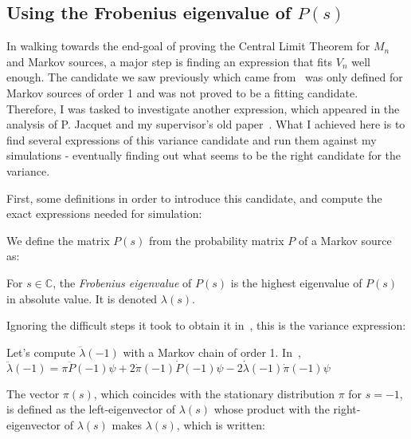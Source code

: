 
\subsection{Using the Frobenius eigenvalue of $P(s)$}


In walking towards the end-goal of proving the Central Limit
Theorem for $M_n$ and Markov sources, a major step is finding
an expression that fits $V_n$ well enough. The candidate we
saw previously which came from~\cite{leckey_limit_2015} was 
only defined for Markov sources of order 1 and was not proved
to be a fitting candidate. Therefore, I was tasked to investigate
another expression, which appeared in the analysis of 
P. Jacquet and my supervisor's old paper~\cite{jacquet_average_2001}.
What I achieved here is to find several expressions of 
this variance candidate and run them against my simulations - eventually
finding out what seems to be the right candidate for the variance.

First, some definitions in order to introduce this candidate, and 
compute the exact expressions needed for simulation:

\begin{df}
    We define the matrix $P(s)$ from the probability matrix $P$ of a 
    Markov source as:
    \label{def:ps}
\end{df}

\begin{df}
    For $s\in\mathbb{C}$, the \emph{Frobenius eigenvalue} of $P(s)$ is the highest 
    eigenvalue of $P(s)$ in absolute value. It is denoted $\lambda(s)$.
    \label{def:frob}
\end{df}

\noindent
Ignoring the difficult steps it took to obtain it in~\cite{jacquet_average_2001},
this is the variance expression:


\noindent Let's compute $\ddot{\lambda}(-1)$ with a Markov chain of order 1.
In~\cite{jacquet_average_2001},
\centers
    {$ \ddot{\lambda}(-1) = \pi \ddot{P}(-1)\psi
                        + 2 \dot{\pi}(-1) \dot{P}(-1) \psi
                        - 2 \dot{\lambda}(-1) \dot{\pi}(-1) \psi $}

\noindent The vector $\pi(s)$, which coincides with the stationary
distribution $\pi$ for $s=-1$, is defined as the left-eigenvector of 
$\lambda(s)$ whose product with the right-eigenvector of $\lambda(s)$
makes $\lambda(s)$, which is written:
   
